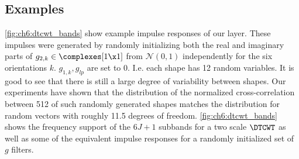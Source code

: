 \subsection{Examples}
\autoref{fig:ch6:dtcwt_bands} show example impulse responses of our layer.
These impulses were generated by randomly initializing both the real and
imaginary parts of $g_{2,k} \in \complexes[1\x 1]$ from $\mathcal{N}(0,1)$
independently for the six orientations $k$. $g_{1,k}, g_{lp}$ are set to 0. 
I.e. each shape has 12 random variables. It is good
to see that there is still a large degree of variability between shapes. Our
experiments have shown that the distribution of the normalized cross-correlation
between 512 of such randomly generated shapes matches the distribution for
random vectors with roughly 11.5 degrees of freedom.
\autoref{fig:ch6:dtcwt_bands} shows the frequency support of the $6J+1$ subbands
for a two scale $\DTCWT$ as well as some of the equivalent impulse responses for
a randomly initialized set of $g$ filters.

